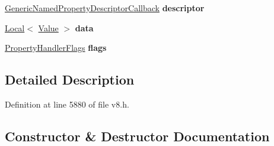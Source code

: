 \begin{DoxyCompactItemize}
\mbox{\hyperlink{namespacev8_a8cf8faa26baffa84173a24906c0d49f6}{Generic\+Named\+Property\+Descriptor\+Callback}} {\bfseries descriptor}
\item 
\mbox{\label{structv8_1_1NamedPropertyHandlerConfiguration_a209f02c8b3202551bb8eef448d750f9d}} 
\mbox{\hyperlink{classv8_1_1Local}{Local}}$<$ \mbox{\hyperlink{classv8_1_1Value}{Value}} $>$ {\bfseries data}
\item 
\mbox{\label{structv8_1_1NamedPropertyHandlerConfiguration_add28e99c72adf78b64e73f1de5aa74c7}} 
\mbox{\hyperlink{namespacev8_af4789f0aeb8680e353901a35810cac1a}{Property\+Handler\+Flags}} {\bfseries flags}
\end{DoxyCompactItemize}


\subsection{Detailed Description}


Definition at line 5880 of file v8.\+h.



\subsection{Constructor \& Destructor Documentation}
\mbox{\label{structv8_1_1NamedPropertyHandlerConfiguration_a850a760f28c244b12042634687024e68}} 
